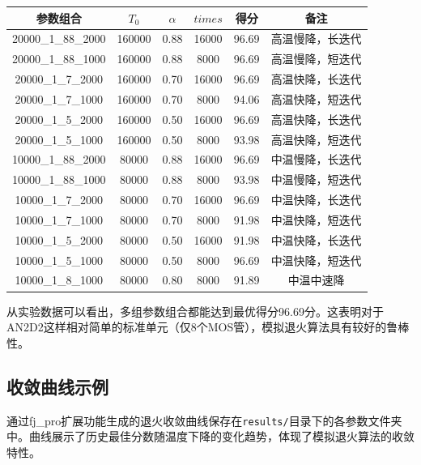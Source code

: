 \documentclass[UTF8,12pt,a4paper]{ctexart}
\begin{document}
\begin{center}
\begin{tabular}{|c|c|c|c|c|c|}
	\hline
	\textbf{参数组合} & \textbf{$T_0$} & \textbf{$\alpha$} & \textbf{$times$} & \textbf{得分} & \textbf{备注} \\
	\hline
	20000\_1\_88\_2000 & 160000 & 0.88 & 16000 & 96.69 & 高温慢降，长迭代 \\
	\hline
	20000\_1\_88\_1000 & 160000 & 0.88 & 8000 & 96.69 & 高温慢降，短迭代 \\
	\hline
	20000\_1\_7\_2000 & 160000 & 0.70 & 16000 & 96.69 & 高温快降，长迭代 \\
	\hline
	20000\_1\_7\_1000 & 160000 & 0.70 & 8000 & 94.06 & 高温快降，短迭代 \\
	\hline
	20000\_1\_5\_2000 & 160000 & 0.50 & 16000 & 96.69 & 高温快降，长迭代 \\
	\hline
	20000\_1\_5\_1000 & 160000 & 0.50 & 8000 & 93.98 & 高温快降，短迭代 \\
	\hline
	10000\_1\_88\_2000 & 80000 & 0.88 & 16000 & 96.69 & 中温慢降，长迭代 \\
	\hline
	10000\_1\_88\_1000 & 80000 & 0.88 & 8000 & 93.98 & 中温慢降，短迭代 \\
	\hline
	10000\_1\_7\_2000 & 80000 & 0.70 & 16000 & 96.69 & 中温快降，长迭代 \\
	\hline
	10000\_1\_7\_1000 & 80000 & 0.70 & 8000 & 91.98 & 中温快降，短迭代 \\
	\hline
	10000\_1\_5\_2000 & 80000 & 0.50 & 16000 & 91.98 & 中温快降，长迭代 \\
	\hline
	10000\_1\_5\_1000 & 80000 & 0.50 & 8000 & 96.69 & 中温快降，短迭代 \\
	\hline
	10000\_1\_8\_1000 & 80000 & 0.80 & 8000 & 91.89 & 中温中速降 \\
	\hline
\end{tabular}
\end{center}

从实验数据可以看出，多组参数组合都能达到最优得分96.69分。这表明对于AN2D2这样相对简单的标准单元（仅8个MOS管），模拟退火算法具有较好的鲁棒性。

\subsection{收敛曲线示例}

通过fj\_pro扩展功能生成的退火收敛曲线保存在\texttt{results/}目录下的各参数文件夹中。曲线展示了历史最佳分数随温度下降的变化趋势，体现了模拟退火算法的收敛特性。
\end{document}
